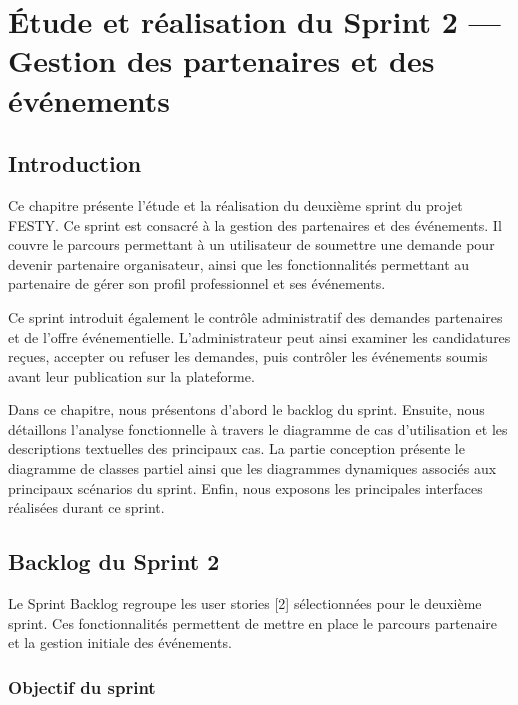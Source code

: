 ﻿%

\chapter{Étude et réalisation du Sprint 2 — Gestion des partenaires et des événements}
\label{chap:sprint2-partenaires-evenements}


\section{Introduction}


Ce chapitre présente l’étude et la réalisation du deuxième sprint du projet FESTY. Ce sprint est consacré à la gestion des partenaires et des événements. Il couvre le parcours permettant à un utilisateur de soumettre une demande pour devenir partenaire organisateur, ainsi que les fonctionnalités permettant au partenaire de gérer son profil professionnel et ses événements.


Ce sprint introduit également le contrôle administratif des demandes partenaires et de l’offre événementielle. L’administrateur peut ainsi examiner les candidatures reçues, accepter ou refuser les demandes, puis contrôler les événements soumis avant leur publication sur la plateforme.


Dans ce chapitre, nous présentons d’abord le backlog du sprint. Ensuite, nous détaillons l’analyse fonctionnelle à travers le diagramme de cas d’utilisation et les descriptions textuelles des principaux cas. La partie conception présente le diagramme de classes partiel ainsi que les diagrammes dynamiques associés aux principaux scénarios du sprint. Enfin, nous exposons les principales interfaces réalisées durant ce sprint.


\section{Backlog du Sprint 2}


Le Sprint Backlog regroupe les user stories [2] sélectionnées pour le deuxième sprint. Ces fonctionnalités permettent de mettre en place le parcours partenaire et la gestion initiale des événements.


\subsection{Objectif du sprint}



